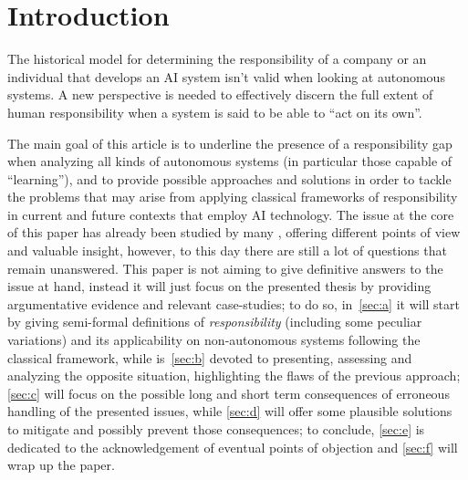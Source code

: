 \section{Introduction}\label{sec:introduction}

The historical model for determining the responsibility of a company or an individual that develops an AI system isn't valid when looking at autonomous systems.
A new perspective is needed to effectively discern the full extent of human responsibility when a system is said to be able to ``act on its own''.

The main goal of this article is to underline the presence of a responsibility gap \parencite{MATTRG-3} when analyzing all kinds of autonomous systems (in particular those capable of ``learning''), and to provide possible approaches and solutions in order to tackle the problems that may arise from applying classical frameworks of responsibility in current and future contexts that employ AI technology.
The issue at the core of this paper has already been studied by many , offering different points of view and valuable insight, however, to this day there are still a lot of questions that remain unanswered.
This paper is not aiming to give definitive answers to the issue at hand, instead it will just focus on the presented thesis by providing argumentative evidence and relevant case-studies; to do so, in~\autoref{sec:a} it will start by giving semi-formal definitions of \textit{responsibility} (including some peculiar variations) and its applicability on non-autonomous systems following the classical framework, while is~\autoref{sec:b} devoted to presenting, assessing and analyzing the opposite situation, highlighting the flaws of the previous approach; \autoref{sec:c} will focus on the possible long and short term consequences of erroneous handling of the presented issues, while \autoref{sec:d} will offer some plausible solutions to mitigate and possibly prevent those consequences; to conclude, \autoref{sec:e} is dedicated to the acknowledgement of eventual points of objection and \autoref{sec:f} will wrap up the paper.